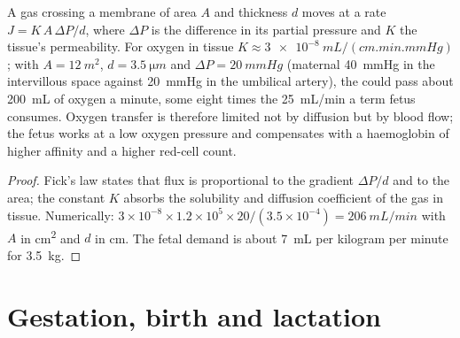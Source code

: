 \begin{theorem}\label{thm:b2:mammal-reproduction:fick}
A gas crossing a membrane of area $A$ and thickness $d$ moves at a
rate $J = K\,A\,\Delta P/d$, where $\Delta P$ is the difference in
its partial pressure and $K$ the tissue's permeability. For oxygen
in tissue $K \approx \qty{3e-8}{mL/(cm.min.mmHg)}$; with $A =
\qty{12}{m^2}$, $d = \qty{3.5}{\micro m}$ and $\Delta P =
\qty{20}{mmHg}$ (maternal \qty{40}{mmHg} in the intervillous space
against \qty{20}{mmHg} in the umbilical artery), the  could
pass about \qty{200}{mL} of oxygen a minute, some eight times the
\qty{25}{mL/min} a term fetus consumes. Oxygen transfer is therefore
limited not by diffusion but by blood flow; the fetus works at a low
oxygen pressure and compensates with a haemoglobin of higher
affinity and a higher red-cell count.
\end{theorem}
\begin{proof}
Fick's law states that flux is proportional to the gradient
$\Delta P/d$ and to the area; the constant $K$ absorbs the solubility
and diffusion coefficient of the gas in tissue. Numerically:
$3\times 10^{-8}\times 1.2\times 10^{5}\times 20/(3.5\times 10^{-4})
= \qty{206}{mL/min}$ with $A$ in \unit{cm^2} and $d$ in \unit{cm}.
The fetal demand is about \qty{7}{mL} per kilogram per minute for
\qty{3.5}{kg}.
\end{proof}

\section{Gestation, birth and lactation}


